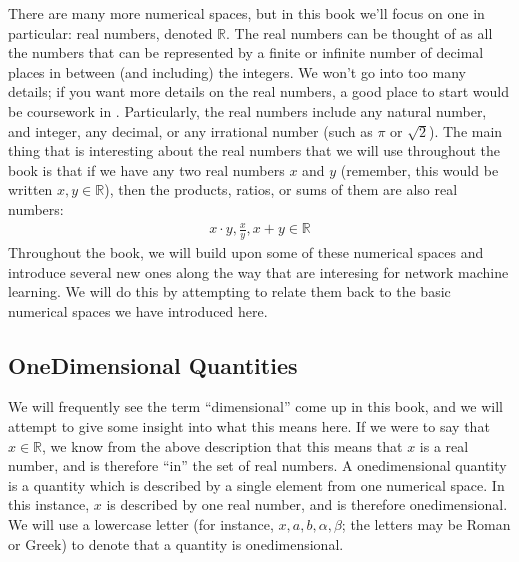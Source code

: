 \documentclass[letterpaper,10pt,english]{jupyterBook}
\begin{document}
\sphinxAtStartPar
There are many more numerical spaces, but in this book we’ll focus on one in particular: real numbers, denoted \(\mathbb R\). The real numbers can be thought of as all the numbers that can be represented by a finite or infinite number of decimal places in between (and including) the integers. We won’t go into too many details; if you want more details on the real numbers, a good place to start would be coursework in . Particularly, the real numbers include any natural number, and integer, any decimal, or any irrational number (such as \(\pi\) or \(\sqrt{2}\)). The main thing that is interesting about the real numbers that we will  use throughout the book is that if we have any two real numbers \(x\) and \(y\) (remember, this would be written \(x, y \in \mathbb R\)), then the products, ratios, or sums of them are also real numbers:
\begin{align*}
    x \cdot y, \frac{x}{y}, x + y \in \mathbb R
\end{align*}
\sphinxAtStartPar
Throughout the book, we will build upon some of these numerical spaces and introduce several new ones along the way that are interesing for network machine learning. We will do this by attempting to relate them back to the basic numerical spaces we have introduced here.


\subsection{One\sphinxhyphen{}Dimensional Quantities}
\label{\detokenize{introduction/terminology:one-dimensional-quantities}}
\sphinxAtStartPar
We will frequently see the term “dimensional” come up in this book, and we will attempt to give some insight into what this means here. If we were to say that \(x \in \mathbb R\), we know from the above description that this means that \(x\) is a real number, and is therefore “in” the set of real numbers. A one\sphinxhyphen{}dimensional quantity is a quantity which is described by a single element from one numerical space. In this instance, \(x\) is described by one real number, and is therefore one\sphinxhyphen{}dimensional. We will use a lowercase letter (for instance, \(x, a, b, \alpha, \beta\); the letters may be Roman or Greek) to denote that a quantity is one\sphinxhyphen{}dimensional.
\end{document}
